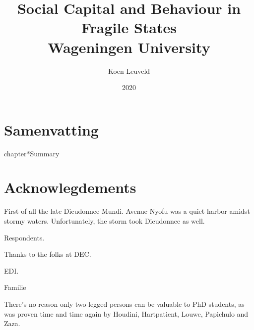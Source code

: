 



\title{
	{Social Capital and Behaviour in Fragile States}\\
	{\large Wageningen University}\\
}
\author{Koen Leuveld}
\date{2020}

\maketitle
\tableofcontents
\todototoc
\listoftodos

 








\clearpage
{}
\chapter*{Samenvatting}


\clearpage
{}
chapter*{Summary}


\chapter*{Acknowlegdements}
First of all the late Dieudonnee Mundi. Avenue Nyofu was a quiet harbor amidst stormy waters. Unfortunately, the storm took Dieudonnee as well.

Respondents.

Thanks to the folks at DEC.

EDI.

Familie


There's no reason only two-legged persons can be valuable to PhD students, as was proven time and time again by Houdini, Hartpatient, Louwe, Papichulo and Zaza.


